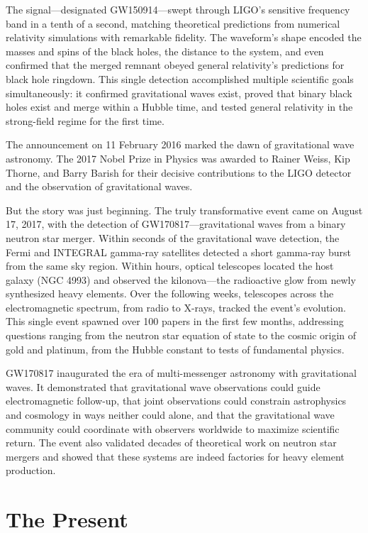 The signal—designated GW150914—swept through LIGO's sensitive frequency band in a tenth of a second, matching theoretical predictions from numerical relativity simulations with remarkable fidelity.
The waveform's shape encoded the masses and spins of the black holes, the distance to the system, and even confirmed that the merged remnant obeyed general relativity's predictions for black hole ringdown.
This single detection accomplished multiple scientific goals simultaneously: it confirmed gravitational waves exist, proved that binary black holes exist and merge within a Hubble time, and tested general relativity in the strong-field regime for the first time.

The announcement on 11 February 2016 marked the dawn of gravitational wave astronomy.
The 2017 Nobel Prize in Physics was awarded to Rainer Weiss, Kip Thorne, and Barry Barish for their decisive contributions to the LIGO detector and the observation of gravitational waves.

But the story was just beginning.
The truly transformative event came on August 17, 2017, with the detection of GW170817—gravitational waves from a binary neutron star merger\cite{collaboration_gw170817_2017}.
Within seconds of the gravitational wave detection, the Fermi and INTEGRAL gamma-ray satellites detected a short gamma-ray burst from the same sky region.
Within hours, optical telescopes located the host galaxy (NGC 4993) and observed the kilonova—the radioactive glow from newly synthesized heavy elements\cite{goldstein_ordinary_2017}.
Over the following weeks, telescopes across the electromagnetic spectrum, from radio to X-rays, tracked the event's evolution.
This single event spawned over 100 papers in the first few months, addressing questions ranging from the neutron star equation of state to the cosmic origin of gold and platinum, from the Hubble constant to tests of fundamental physics.

GW170817 inaugurated the era of multi-messenger astronomy with gravitational waves.
It demonstrated that gravitational wave observations could guide electromagnetic follow-up, that joint observations could constrain astrophysics and cosmology in ways neither could alone, and that the gravitational wave community could coordinate with observers worldwide to maximize scientific return.
The event also validated decades of theoretical work on neutron star mergers and showed that these systems are indeed factories for heavy element production.


\section{The Present}\label{sec:the-present}

